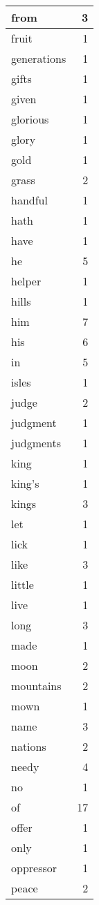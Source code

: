 \begin{center}
\begin{longtable}{l|r}
from & 3\\ \hline 
fruit & 1\\ \hline 
generations & 1\\ \hline 
gifts & 1\\ \hline 
given & 1\\ \hline 
glorious & 1\\ \hline 
glory & 1\\ \hline 
gold & 1\\ \hline 
grass & 2\\ \hline 
handful & 1\\ \hline 
hath & 1\\ \hline 
have & 1\\ \hline 
he & 5\\ \hline 
helper & 1\\ \hline 
hills & 1\\ \hline 
him & 7\\ \hline 
his & 6\\ \hline 
in & 5\\ \hline 
isles & 1\\ \hline 
judge & 2\\ \hline 
judgment & 1\\ \hline 
judgments & 1\\ \hline 
king & 1\\ \hline 
king's & 1\\ \hline 
kings & 3\\ \hline 
let & 1\\ \hline 
lick & 1\\ \hline 
like & 3\\ \hline 
little & 1\\ \hline 
live & 1\\ \hline 
long & 3\\ \hline 
made & 1\\ \hline 
moon & 2\\ \hline 
mountains & 2\\ \hline 
mown & 1\\ \hline 
name & 3\\ \hline 
nations & 2\\ \hline 
needy & 4\\ \hline 
no & 1\\ \hline 
of & 17\\ \hline 
offer & 1\\ \hline 
only & 1\\ \hline 
oppressor & 1\\ \hline 
peace & 2\\ \hline 

\end{longtable}
\end{center}
